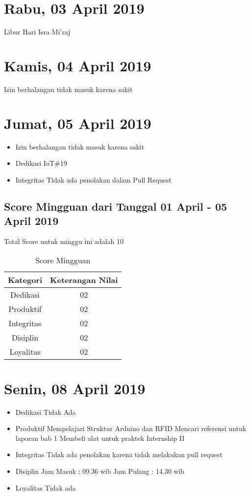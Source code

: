 \section{Rabu, 03 April 2019}
Libur Hari Isra Mi'raj

\section{Kamis, 04 April 2019}
Izin berhalangan tidak masuk karena sakit

\section{Jumat, 05 April 2019}
\begin{itemize}
\item Izin berhalangan tidak masuk karena sakit
\item Dedikasi
\subitem IoT\#19
\item Integritas
 \subitem Tidak ada penolakan dalam Pull Request
\end{itemize}

\subsection{Score Mingguan dari Tanggal 01 April - 05 April 2019}
Total Score untuk minggu ini adalah 10

\begin{table}[h]
\caption{Score Mingguan}
\centering
\begin{tabular}{|c|c|}
\hline
\textbf{Kategori}&\textbf{Keterangan Nilai}\\
\hline
Dedikasi&02\\
\hline
Produktif&02\\
\hline
Integritas&02\\
\hline
Disiplin&02\\
\hline
Loyalitas&02\\
\hline
\end{tabular}
\label{table:score mingguan}
\end{table}

\section{Senin, 08 April 2019}
\begin{itemize}
\item Dedikasi
\subitem Tidak Ada
\item Produktif
  \subitem Mempelajari Struktur Arduino dan RFID
  \subitem Mencari referensi untuk laporan bab 1
  \subitem Membeli alat untuk praktek Internship II
\item Integritas
  \subitem Tidak ada penolakan karena tidak melakukan pull request
\item Disiplin
  \subitem Jam Masuk : 09.36 wib
  \subitem Jam Pulang : 14.30 wib
\item Loyalitas
  \subitem Tidak ada
\end{itemize}
